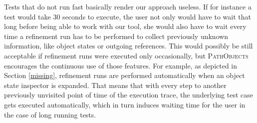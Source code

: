 Tests that do not run fast basically render our approach useless.
If for instance a test would take 30 seconds to execute, the user not only would have to wait that long before being able to work with our tool, she would also have to wait every time a refinement run has to be performed to collect previously unknown information, like object states or outgoing references.
This would possibly be still acceptable if refinement runs were executed only occasionally, but \textsc{PathObjects} encourages the continuous use of those features.
For example, as depicted in Section \ref{missing}, refinement runs are performed automatically when an object state inspector is expanded.
That means that with every step to another previously unvisited point of time of the execution trace, the underlying test case gets executed automatically, which in turn induces waiting time for the user in the case of long running tests.